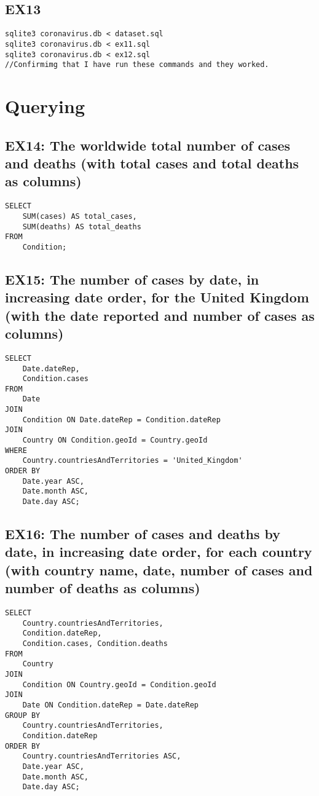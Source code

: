 \documentclass{article}
\begin{document}
\subsection*{EX13}
\begin{verbatim}
sqlite3 coronavirus.db < dataset.sql
sqlite3 coronavirus.db < ex11.sql
sqlite3 coronavirus.db < ex12.sql
//Confirmimg that I have run these commands and they worked.
\end{verbatim}

\section{Querying}
\subsection*{EX14: The worldwide total number of cases and deaths (with total cases and total deaths as columns)}
\begin{verbatim}
SELECT
    SUM(cases) AS total_cases,
    SUM(deaths) AS total_deaths
FROM
    Condition;
\end{verbatim}
\newpage
\subsection*{EX15: The number of cases by date, in increasing date order, for the United Kingdom (with the date reported and number of cases as columns)}
\begin{verbatim}
SELECT
    Date.dateRep,
    Condition.cases
FROM
    Date
JOIN
    Condition ON Date.dateRep = Condition.dateRep
JOIN
    Country ON Condition.geoId = Country.geoId
WHERE
    Country.countriesAndTerritories = 'United_Kingdom'
ORDER BY
    Date.year ASC,
    Date.month ASC,
    Date.day ASC;
\end{verbatim}
\subsection*{EX16: The number of cases and deaths by date, in increasing date order, for each country (with country name, date, number of cases and number of deaths as columns)}
\begin{verbatim}
SELECT
    Country.countriesAndTerritories,
    Condition.dateRep,
    Condition.cases, Condition.deaths
FROM
    Country
JOIN
    Condition ON Country.geoId = Condition.geoId
JOIN
    Date ON Condition.dateRep = Date.dateRep
GROUP BY
    Country.countriesAndTerritories,
    Condition.dateRep
ORDER BY
    Country.countriesAndTerritories ASC,
    Date.year ASC,
    Date.month ASC,
    Date.day ASC;
\end{verbatim}
\end{document}
